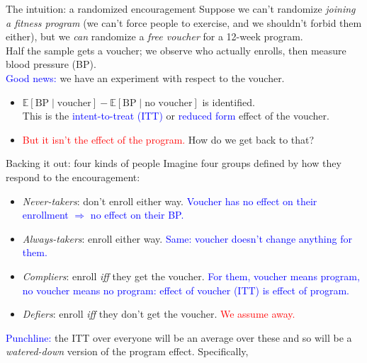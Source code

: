 \documentclass[xcolor=dvipsnames]{beamer}
\newcommand{\E}{\mathbb{E}}
\begin{document}
\begin{frame}{The intuition: a randomized encouragement}
 Suppose we can't randomize \textit{joining a fitness program} (we can't force people to exercise, and we shouldn't forbid them either), but we \textit{can} randomize a \textit{free voucher} for a 12-week program.\\
\bigskip
{} Half the sample gets a voucher; we observe who actually enrolls, then measure blood pressure (BP).\\
\bigskip
{} \textcolor{Blue}{Good news:} we have an experiment with respect to the voucher.
\begin{itemize}
\item<4-> $\E[\text{BP} \mid \text{voucher}] - \E[\text{BP} \mid \text{no voucher}]$ is identified.\\
This is the \textcolor{Blue}{intent-to-treat (ITT)} or \textcolor{Blue}{reduced form} effect of the voucher.
\item<5-> \textcolor{Red}{But it isn't the effect of the program.} How do we get back to that?
\end{itemize}
\end{frame}

\begin{frame}{Backing it out: four kinds of people}
 Imagine four groups defined by how they respond to the encouragement:
\small
\begin{itemize}
\item<2-> \textit{Never-takers}: don't enroll either way. \textcolor{Blue}{Voucher has no effect on their enrollment $\Rightarrow$ no effect on their BP.}
\smallskip
\item<3-> \textit{Always-takers}: enroll either way. \textcolor{Blue}{Same: voucher doesn't change anything for them.}
\smallskip
\item<4-> \textit{Compliers}: enroll \textit{iff} they get the voucher. \textcolor{Blue}{For them, voucher means program, no voucher means no program: effect of voucher (ITT) is effect of program.}
\smallskip
\item<5-> \textit{Defiers}: enroll \textit{iff} they don't get the voucher. \textcolor{Red}{We assume away.}
\end{itemize}
\bigskip
{} \normalsize \textcolor{Blue}{Punchline:} the ITT over everyone will be an average over these and so will be a \textit{watered-down} version of the program effect. Specifically,
\end{frame}
\end{document}

